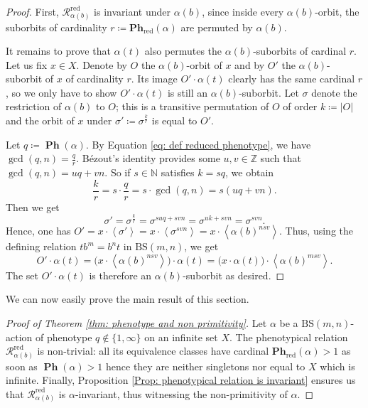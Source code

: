 \documentclass[12pt]{article}
\numberwithin{equation}{section}
\theoremstyle{definition}
\newcommand{\N}{\mathbb{N}}
\newcommand{\Z}{\mathbb{Z}}
\newcommand{\la}{\left\langle}
\newcommand{\ra}{\right\rangle}
\newcommand{\abs}[1]{\left\lvert #1\right\rvert}
\newcommand{\Rc}{\mathcal{R}}
\newcommand\BSo{\mathrm{BS}}
\DeclareMathOperator\PHE{\mathbf{Ph}}
\newcommand\PHEred{\mathbf{Ph}_{\textrm{red}}}
\begin{document}
    \begin{proof}
        First, $\Rc^{\mathrm{red}}_{\alpha(b)}$ is invariant under $\alpha(b)$,
        since inside every $\alpha(b)$-orbit, the suborbits of cardinality $r\coloneqq \PHEred(\alpha)$ are permuted by $\alpha(b)$.

    
       It remains to prove that $\alpha(t)$ also permutes the $\alpha(b)$-suborbits of cardinal $r$.
        Let us fix $x\in X$.
        Denote by $O$ the $\alpha(b)$-orbit of \( x \) and by $O'$ the $\alpha(b)$-suborbit of \( x \) of cardinality $r$.
        Its image $O' \cdot \alpha(t)$ clearly has the same cardinal $r$, so we only have to show $O' \cdot \alpha(t)$ is still an $\alpha(b)$-suborbit. 
        Let $\sigma$ denote the restriction of $\alpha(b)$ to $O$; this is a transitive permutation of $O$ of order $k\coloneqq\abs O$
        and the orbit of \( x \) under $\sigma' \coloneqq \sigma^{\frac{k}{r}}$ is equal to $O'$.
        

        

Let $q\coloneqq\PHE(\alpha)$. By Equation \eqref{eq: def reduced phenotype}, we have 
$\gcd(q,n)=\frac{q}{r}$. Bézout's identity provides some $u, v \in \Z$ such that $\gcd(q, n)=uq + vn.$
        So if $s\in\N$ satisfies  $k=sq$, 
        we obtain
        \[
            \frac{k}{r}
            = s\cdot\frac{ q}{r}
            = s \cdot \gcd(q, n)
            = s (uq + vn) .
        \]
        Then we get
        \[
            \sigma' = \sigma^{\frac{k}{r}}
            = \sigma^{suq + svn} 
            = \sigma^{u k + svn}
            = \sigma^{svn}.
        \]
        Hence, one has $O' = x \cdot \la \sigma' \ra = x \cdot \la \sigma^{svn} \ra=x \cdot \la \alpha(b)^{nsv} \ra$.
        Thus, using the defining relation $tb^m = b^nt$ in \( \BSo(m,n)  \), we get
         \[
            O' \cdot \alpha(t)
            = \big( x \cdot \la \alpha(b)^{nsv} \ra \big) \cdot \alpha(t)
            =\big( x \cdot \alpha(t) \big) \cdot \la \alpha(b)^{msv} \ra .
        \]
        The set $O'\cdot \alpha(t)$ is therefore an $\alpha(b)$-suborbit as desired.
    \end{proof}
    
	We can now easily prove the main result of this section. 

	\begin{proof}[Proof of Theorem \ref{thm: phenotype and non primitivity}]
		Let \( \alpha \) be a \(\BSo(m,n)\)-action of phenotype \( q\notin\{1,\infty\} \)
		on an infinite set \(X\).
		The phenotypical relation \(\Rc^{\mathrm{red}}_{\alpha(b)}\) is non-trivial: 
		all its equivalence classes have cardinal \(\PHEred(\alpha)>1\) as soon as \(\PHE(\alpha)>1\) 
		hence they are neither singletons nor equal to \(X\) which is infinite. 
	    Finally, Proposition \ref{Prop: phenotypical relation is invariant} ensures us that
		\(\Rc^{\mathrm{red}}_{\alpha(b)}\) is \( \alpha \)-invariant, 
		thus witnessing the non-primitivity of \( \alpha \).
	\end{proof}
\end{document}
